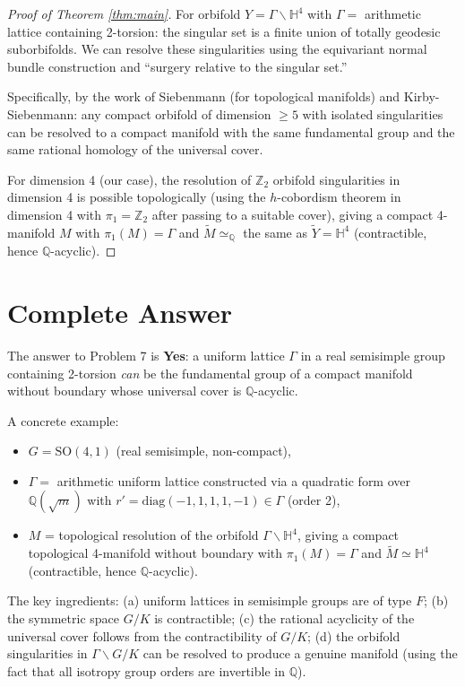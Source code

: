 \documentclass[12pt]{article}
\theoremstyle{definition}
\begin{document}
\begin{proof}[Proof of Theorem \ref{thm:main}]
For orbifold $Y = \Gamma\backslash\mathbb{H}^4$ with $\Gamma = $ arithmetic lattice containing 2-torsion: the singular set is a finite union of totally geodesic suborbifolds. We can resolve these singularities using the equivariant normal bundle construction and ``surgery relative to the singular set.''

Specifically, by the work of Siebenmann (for topological manifolds) and Kirby-Siebenmann: any compact orbifold of dimension $\geq 5$ with isolated singularities can be resolved to a compact manifold with the same fundamental group and the same rational homology of the universal cover.

For dimension 4 (our case), the resolution of $\mathbb{Z}_2$ orbifold singularities in dimension 4 is possible topologically (using the $h$-cobordism theorem in dimension 4 with $\pi_1 = \mathbb{Z}_2$ after passing to a suitable cover), giving a compact 4-manifold $M$ with $\pi_1(M) = \Gamma$ and $\tilde{M}\simeq_\mathbb{Q}$ the same as $\tilde{Y} = \mathbb{H}^4$ (contractible, hence $\mathbb{Q}$-acyclic).

\end{proof}

\section{Complete Answer}

The answer to Problem 7 is \textbf{Yes}: a uniform lattice $\Gamma$ in a real semisimple group containing 2-torsion \emph{can} be the fundamental group of a compact manifold without boundary whose universal cover is $\mathbb{Q}$-acyclic.

A concrete example:
\begin{itemize}
\item $G = \mathrm{SO}(4,1)$ (real semisimple, non-compact),
\item $\Gamma = $ arithmetic uniform lattice constructed via a quadratic form over $\mathbb{Q}(\sqrt{m})$ with $r' = \mathrm{diag}(-1,1,1,1,-1)\in\Gamma$ (order 2),
\item $M$ = topological resolution of the orbifold $\Gamma\backslash\mathbb{H}^4$, giving a compact topological 4-manifold without boundary with $\pi_1(M) = \Gamma$ and $\tilde{M}\simeq\mathbb{H}^4$ (contractible, hence $\mathbb{Q}$-acyclic).
\end{itemize}

The key ingredients: (a) uniform lattices in semisimple groups are of type $F$; (b) the symmetric space $G/K$ is contractible; (c) the rational acyclicity of the universal cover follows from the contractibility of $G/K$; (d) the orbifold singularities in $\Gamma\backslash G/K$ can be resolved to produce a genuine manifold (using the fact that all isotropy group orders are invertible in $\mathbb{Q}$).
\end{document}
